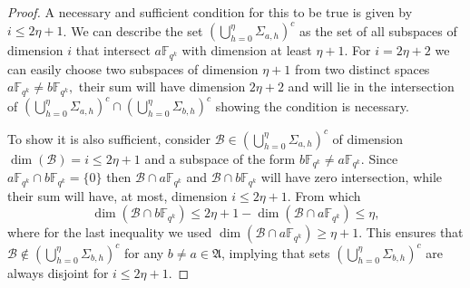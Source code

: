 \documentclass{article}
\newcommand{\Fqk}{\mathbb{F}_{q^k}}
\newcommand{\calB}{\mathcal{B}}
\begin{document}
\begin{proof}
    A necessary and sufficient condition for this to be true is given by $i \leq 2 \eta + 1$.
    We can describe the set $\left(\bigcup_{h=0}^\eta\Sigma_{a,h}\right)^c$ as the set of all subspaces of dimension $i$ that intersect $a \Fqk$ with dimension at least $\eta + 1$.
    For $i = 2 \eta + 2$ we can easily choose two subspaces of dimension $\eta + 1$ from two distinct spaces $a \Fqk \neq b \Fqk,$ their sum will have dimension $2 \eta + 2$ and will lie in the intersection of $\left(\bigcup_{h=0}^\eta\Sigma_{a,h}\right)^c \cap \left(\bigcup_{h=0}^\eta\Sigma_{b,h}\right)^c$ showing the condition is necessary.
    
    To show it is also sufficient, consider $\calB \in \left(\bigcup_{h=0}^\eta\Sigma_{a,h}\right)^c$ of dimension $\dim(\calB) = i \leq 2 \eta + 1$ and a subspace of the form $b \Fqk \neq a \Fqk$.
    Since $a \Fqk \cap b \Fqk = \{0\}$ then $\calB \cap a \Fqk$ and $\calB \cap b \Fqk$ will have zero intersection, while their sum will have, at most, dimension $i \leq 2\eta + 1$.
    From which
    \[
      \dim(\calB \cap b \Fqk) \leq  2 \eta + 1  - \dim(\calB \cap  a\Fqk) \leq \eta, 
    \]
    where for the last inequality we used $\dim(\calB \cap a \Fqk) \geq \eta + 1.$
    This ensures that $\calB \notin \left(\bigcup_{h=0}^\eta\Sigma_{b,h}\right)^c$ for any $b \neq a \in \mathfrak{A}$, implying that sets $\left(\bigcup_{h=0}^\eta\Sigma_{b,h}\right)^c$ are always disjoint for $i \leq 2 \eta +1$.
    \end{proof}
   
\end{document}
